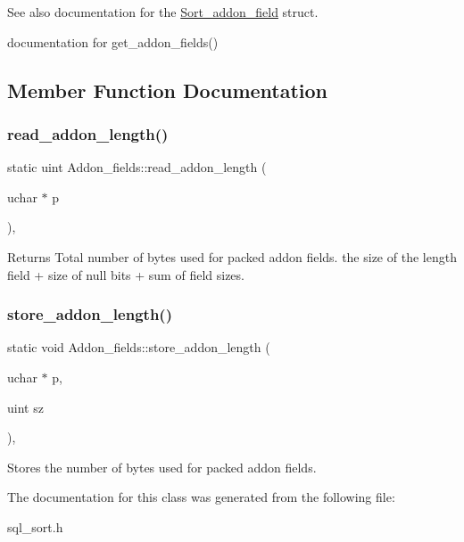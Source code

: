 \begin{DoxySeeAlso}{See also}
documentation for the \mbox{\hyperlink{structSort__addon__field}{Sort\+\_\+addon\+\_\+field}} struct. 

documentation for get\+\_\+addon\+\_\+fields() 
\end{DoxySeeAlso}


\subsection{Member Function Documentation}
\mbox{\label{classAddon__fields_a0cd4ab5178755aec49e999f78127864b}} 
\subsubsection{\texorpdfstring{read\+\_\+addon\+\_\+length()}{read\_addon\_length()}}
{\footnotesize\ttfamily static uint Addon\+\_\+fields\+::read\+\_\+addon\+\_\+length (\begin{DoxyParamCaption}\item[{uchar $\ast$}]{p }\end{DoxyParamCaption})\hspace{0.3cm}{\ttfamily [inline]}, {\ttfamily [static]}}

\begin{DoxyReturn}{Returns}
Total number of bytes used for packed addon fields. the size of the length field + size of null bits + sum of field sizes. 
\end{DoxyReturn}
\mbox{\label{classAddon__fields_a0d834a609fc85decc8d6ee3eaafbf109}} 
\subsubsection{\texorpdfstring{store\+\_\+addon\+\_\+length()}{store\_addon\_length()}}
{\footnotesize\ttfamily static void Addon\+\_\+fields\+::store\+\_\+addon\+\_\+length (\begin{DoxyParamCaption}\item[{uchar $\ast$}]{p,  }\item[{uint}]{sz }\end{DoxyParamCaption})\hspace{0.3cm}{\ttfamily [inline]}, {\ttfamily [static]}}

Stores the number of bytes used for packed addon fields. 

The documentation for this class was generated from the following file\+:\begin{DoxyCompactItemize}
\item 
sql\+\_\+sort.\+h\end{DoxyCompactItemize}
